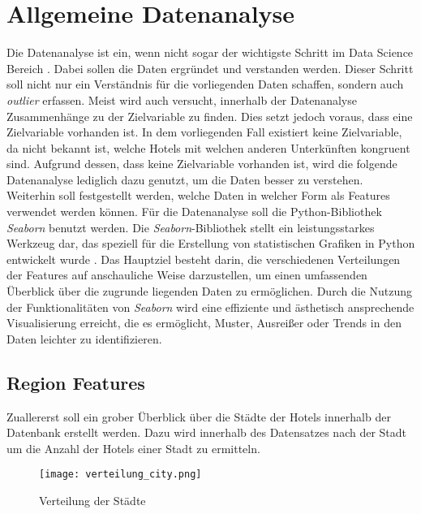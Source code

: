 \section{Allgemeine Datenanalyse}
\label{subsec:Datenanalyse}
Die Datenanalyse ist ein, wenn nicht sogar der wichtigste Schritt im Data Science Bereich \cite{Agarwal.05.10.2018}. Dabei sollen die Daten ergründet und verstanden werden. Dieser Schritt soll nicht nur ein Verständnis für die vorliegenden Daten schaffen, sondern auch \emph{outlier} erfassen. Meist wird auch versucht, innerhalb der Datenanalyse Zusammenhänge zu der Zielvariable zu finden. Dies setzt jedoch voraus, dass eine Zielvariable vorhanden ist. In dem vorliegenden Fall existiert keine Zielvariable, da nicht bekannt ist, welche Hotels mit welchen anderen Unterkünften kongruent sind. Aufgrund dessen, dass keine Zielvariable vorhanden ist, wird die folgende Datenanalyse lediglich dazu genutzt, um die Daten besser zu verstehen. Weiterhin soll festgestellt werden, welche Daten in welcher Form als Features verwendet werden können.
\newline
\newline
Für die Datenanalyse soll die Python-Bibliothek \emph{Seaborn} benutzt werden. Die \emph{Seaborn}-Bibliothek stellt ein leistungsstarkes Werkzeug dar, das speziell für die Erstellung von statistischen Grafiken in Python entwickelt wurde \cite{Melanie.2023}. Das Hauptziel besteht darin, die verschiedenen Verteilungen der Features auf anschauliche Weise darzustellen, um einen umfassenden Überblick über die zugrunde liegenden Daten zu ermöglichen. Durch die Nutzung der Funktionalitäten von \emph{Seaborn} wird eine effiziente und ästhetisch ansprechende Visualisierung erreicht, die es ermöglicht, Muster, Ausreißer oder Trends in den Daten leichter zu identifizieren.

\subsection{Region Features}
Zuallererst soll ein grober Überblick über die Städte der Hotels innerhalb der Datenbank erstellt werden. Dazu wird innerhalb des Datensatzes nach der Stadt um die Anzahl der Hotels einer Stadt zu ermitteln.

\newpage

\begin{figure}[h]
    \centering
    \texttt{[image: verteilung\_city.png]}
    \caption[Verteilung der Städte]{Verteilung der Städte}
    \label{img:verteilung_city}
\end{figure}

